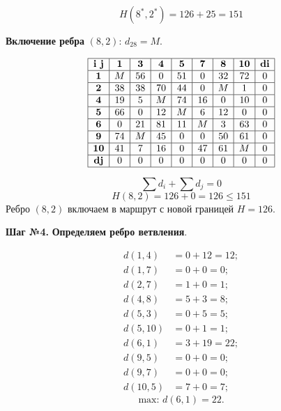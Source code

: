 \documentclass[17pt]{extarticle}
\begin{document}
\[ H(8^*,2^*) = 126 + 25 = 151 \]

\textbf{Включение ребра} \((8,2)\): \( d_{28} = M \).

\[
    \begin{array}{|c|c|c|c|c|c|c|c|c|}
        \hline
        \textbf{i j} & \textbf{1} & \textbf{3} & \textbf{4} & \textbf{5} & \textbf{7} & \textbf{8} & \textbf{10} & \textbf{di} \\
        \hline
        \textbf{1}   & M          & 56         & 0          & 51         & 0          & 32         & 72          & 0           \\
        \hline
        \textbf{2}   & 38         & 38         & 70         & 44         & 0          & M          & 1           & 0           \\
        \hline
        \textbf{4}   & 19         & 5          & M          & 74         & 16         & 0          & 10          & 0           \\
        \hline
        \textbf{5}   & 66         & 0          & 12         & M          & 6          & 12         & 0           & 0           \\
        \hline
        \textbf{6}   & 0          & 21         & 81         & 11         & M          & 3          & 63          & 0           \\
        \hline
        \textbf{9}   & 74         & M          & 45         & 0          & 0          & 50         & 61          & 0           \\
        \hline
        \textbf{10}  & 41         & 7          & 16         & 0          & 47         & 61         & M           & 0           \\
        \hline
        \textbf{dj}  & 0          & 0          & 0          & 0          & 0          & 0          & 0           & 0           \\
        \hline
    \end{array}
\]

\[ \sum d_i + \sum d_j = 0 \]
\[ H(8,2) = 126 + 0 = 126 \leq 151 \]
Ребро \((8,2)\) включаем в маршрут с новой границей \( H = 126 \).

\textbf{Шаг №4.}
\textbf{Определяем ребро ветвления}.

\[
    \begin{aligned}
        d(1,4)  & = 0 + 12 = 12; \\
        d(1,7)  & = 0 + 0 = 0;   \\
        d(2,7)  & = 1 + 0 = 1;   \\
        d(4,8)  & = 5 + 3 = 8;   \\
        d(5,3)  & = 0 + 5 = 5;   \\
        d(5,10) & = 0 + 1 = 1;   \\
        d(6,1)  & = 3 + 19 = 22; \\
        d(9,5)  & = 0 + 0 = 0;   \\
        d(9,7)  & = 0 + 0 = 0;   \\
        d(10,5) & = 7 + 0 = 7;
    \end{aligned}
\]
\[ \text{max: } d(6,1) = 22. \]
\end{document}
